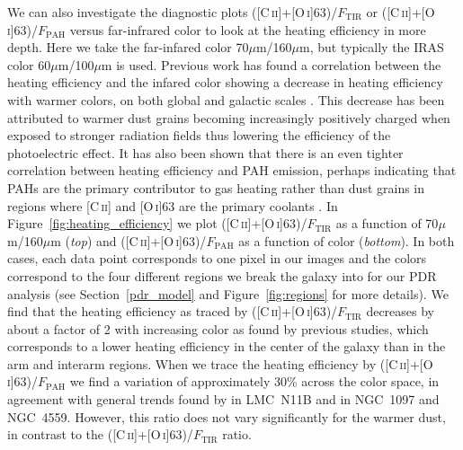 \documentclass[preprint2]{aastex}
\begin{document}
We can also investigate the diagnostic plots ([C\,\textsc{ii}]+[O\,\textsc{i}]63)/$F_{\mathrm{TIR}}$ or ([C\,\textsc{ii}]+[O\,\textsc{i}]63)/$F_{\mathrm{PAH}}$ versus far-infrared color to look at the heating efficiency in more depth. Here we take the far-infared color 70$\mu$m/160$\mu$m, but typically the IRAS color 60$\mu$m/100$\mu$m is used.  Previous work has found a correlation between the heating efficiency and the infared color showing a decrease in heating efficiency with warmer colors, on both global and galactic scales \citep[e.g.][]{2001ApJ...561..766M,2012ApJ...747...81C}. This decrease has been attributed to warmer dust grains becoming increasingly positively charged when exposed to stronger radiation fields thus lowering the efficiency of the photoelectric effect.  It has also been shown that there is an even tighter correlation between heating efficiency and PAH emission, perhaps indicating that PAHs are the primary contributor to gas heating rather than dust grains in regions where [C\,\textsc{ii}] and [O\,\textsc{i}]63 are the primary coolants \citep{2012ApJ...747...81C, 2012A&A...548A..91L}.  In Figure~\ref{fig:heating_efficiency} we plot ([C\,\textsc{ii}]+[O\,\textsc{i}]63)/$F_{\mathrm{TIR}}$ as a function of 70$\mu$m/160$\mu$m (\emph{top}) and ([C\,\textsc{ii}]+[O\,\textsc{i}]63)/$F_{\mathrm{PAH}}$ as a function of color (\emph{bottom}).  In both cases, each data point corresponds to one pixel in our images and the colors correspond to the four different regions we break the galaxy into for our PDR analysis (see Section~\ref{pdr_model} and Figure~\ref{fig:regions} for more details).  We find that the heating efficiency as traced by ([C\,\textsc{ii}]+[O\,\textsc{i}]63)/$F_{\mathrm{TIR}}$ decreases by about a factor of 2 with increasing color as found by previous studies, which corresponds to a lower heating efficiency in the center of the galaxy than in the arm and interarm regions.  When we trace the heating efficiency by ([C\,\textsc{ii}]+[O\,\textsc{i}]63)/$F_{\mathrm{PAH}}$ we find a variation of approximately 30\% across the color space, in agreement with general trends found by \citet{2012A&A...548A..91L} in LMC~N11B and \citet{2012ApJ...747...81C} in NGC~1097 and NGC~4559.  However, this ratio does not vary significantly for the warmer dust, in contrast to the ([C\,\textsc{ii}]+[O\,\textsc{i}]63)/$F_{\mathrm{TIR}}$ ratio.
\end{document}
